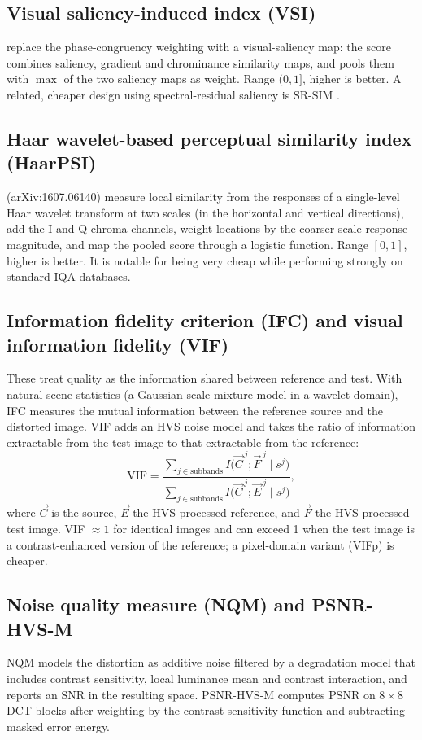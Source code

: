 \subsection{Visual saliency-induced index (VSI)}
\citet{zhang2014vsi} replace the phase-congruency weighting with a visual-saliency map: the score combines saliency, gradient and chrominance similarity maps, and pools them with $\max$ of the two saliency maps as weight. Range $(0,1]$, higher is better. A related, cheaper design using spectral-residual saliency is SR-SIM \citep{zhang2012srsim}.

\subsection{Haar wavelet-based perceptual similarity index (HaarPSI)}
\citet{reisenhofer2018haarpsi} (arXiv:1607.06140) measure local similarity from the responses of a single-level Haar wavelet transform at two scales (in the horizontal and vertical directions), add the I and Q chroma channels, weight locations by the coarser-scale response magnitude, and map the pooled score through a logistic function. Range $[0,1]$, higher is better. It is notable for being very cheap while performing strongly on standard IQA databases.

\subsection{Information fidelity criterion (IFC) and visual information fidelity (VIF)}
These treat quality as the information shared between reference and test. With natural-scene statistics (a Gaussian-scale-mixture model in a wavelet domain), IFC \citep{sheikh2005ifc} measures the mutual information between the reference source and the distorted image. VIF \citep{sheikh2006vif} adds an HVS noise model and takes the ratio of information extractable from the test image to that extractable from the reference:
\[
\mathrm{VIF}=\frac{\sum_{j\in\text{subbands}} I\big(\vec C^{\,j};\vec F^{\,j}\mid s^{j}\big)}
                  {\sum_{j\in\text{subbands}} I\big(\vec C^{\,j};\vec E^{\,j}\mid s^{j}\big)},
\]
where $\vec C$ is the source, $\vec E$ the HVS-processed reference, and $\vec F$ the HVS-processed test image. VIF $\approx 1$ for identical images and can exceed 1 when the test image is a contrast-enhanced version of the reference; a pixel-domain variant (VIFp) is cheaper.

\subsection{Noise quality measure (NQM) and PSNR-HVS-M}
NQM \citep{damera2000nqm} models the distortion as additive noise filtered by a degradation model that includes contrast sensitivity, local luminance mean and contrast interaction, and reports an SNR in the resulting space. PSNR-HVS-M \citep{ponomarenko2007psnrhvsm} computes PSNR on $8\times8$ DCT blocks after weighting by the contrast sensitivity function and subtracting masked error energy.

